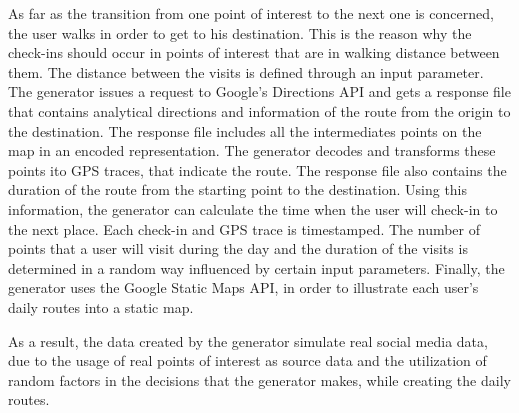 As far as the transition from one point of interest to the next one is concerned, the user walks in order to get to his destination. This is the reason why 
the check-ins should occur in points of interest that are in walking distance between them. The distance between the visits is defined through an input 
parameter. The generator issues a request to Google's Directions API and gets a response file that contains analytical directions and information of the route 
from the origin to the destination. The response file includes all the intermediates points on the map in an encoded representation. The generator 
decodes and transforms these points ito GPS traces, that indicate the route. The response file also contains the duration of the route from the starting point to 
the destination. Using this information, the generator can calculate the time when the user will check-in to the next place. Each check-in and GPS trace is 
timestamped. The number of points that a user will visit during the day and the duration of the visits is determined in a random way influenced by 
certain input parameters. Finally, the generator uses the Google Static Maps API, in order to illustrate each user's daily routes into a static map.

As a result, the data created by the generator simulate real social media data, due to the usage of real points of interest as source data and 
the utilization of random factors in the decisions that the generator makes, while creating the daily routes.

















